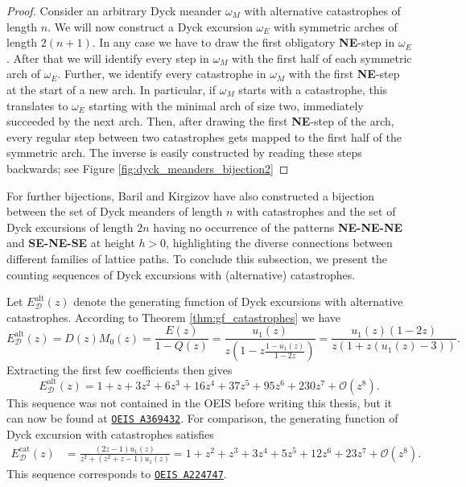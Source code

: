 \begin{proof}
  Consider an arbitrary Dyck meander $\omega_M$ with alternative catastrophes of length $n$. We will now construct a Dyck excursion $\omega_E$ with symmetric arches of length $2(n+1)$.
  In any case we have to draw the first obligatory \textbf{NE}-step in $\omega_E$.
  After that we will identify every step in $\omega_M$ with the first half of each symmetric arch of $\omega_E$.
  Further, we identify every catastrophe in $\omega_M$ with the first \textbf{NE}-step at the start of a new arch.
  In particular, if $\omega_M$ starts with a catastrophe, this translates to $\omega_E$ starting with the minimal arch of size two, immediately succeeded by the next arch. 
  Then, after drawing the first \textbf{NE}-step of the arch, every regular step between two catastrophes gets mapped to the first half of the symmetric arch.
  The inverse is easily constructed by reading these steps backwards; see Figure \ref{fig:dyck_meanders_bijection2}
\end{proof}

For further bijections, Baril and Kirgizov \cite[Theorem 1]{Bijections} have also constructed a bijection between the set of Dyck meanders of length $n$ with catastrophes and the set of Dyck excursions of length $2n$ having no occurrence of the patterns \textbf{NE-NE-NE} and \textbf{SE-NE-SE} at height $h > 0$, highlighting the diverse connections between different families of lattice paths. To conclude this subsection, we present the counting sequences of Dyck excursions with (alternative) catastrophes.

\begin{example}
  Let $E_\mathcal{D}^\mathrm{alt}(z)$ denote the generating function of Dyck excursions with alternative catastrophes.
  According to Theorem \ref{thm:gf_catastrophes} we have $$
  E_\mathcal{D}^\mathrm{alt}(z) = D(z)M_0(z) = \frac{E(z)}{1 - Q(z)} = \frac{u_1(z)}{z\left(1 - z\frac{1 - u_1(z)}{1- 2z}\right)} = \frac{u_1(z)(1-2z)}{z(1+z(u_1(z)- 3))}.
  $$
  Extracting the first few coefficients then gives 
  $$ 
  E_\mathcal{D}^\mathrm{alt}(z) = 1 + z + 3z^{2} + 6z^{3} + 16z^{4} + 37z^{5} + 95z^{6} + 230z^{7} + \mathcal{O}(z^{8}).
  $$
  This sequence was not contained in the OEIS before writing this thesis, but it can now be found at \href{https://oeis.org/A369432}{\texttt{OEIS A369432}}.
  For comparison, the generating function of Dyck excursion with catastrophes satisfies
  \begin{align*}
    E_\mathcal{D}^\mathrm{cat}(z) &= \frac{(2z-1)u_1(z)}{z^2 + (z^2+z-1)u_1(z)}
    = 1 + z^2 + z^3 + 3z^4 + 5z^5 + 12z^6 + 23z^7 + \mathcal{O}(z^8).
  \end{align*}
  This sequence corresponds to \href{https://oeis.org/A224747}{\texttt{OEIS A224747}}.
\end{example}

